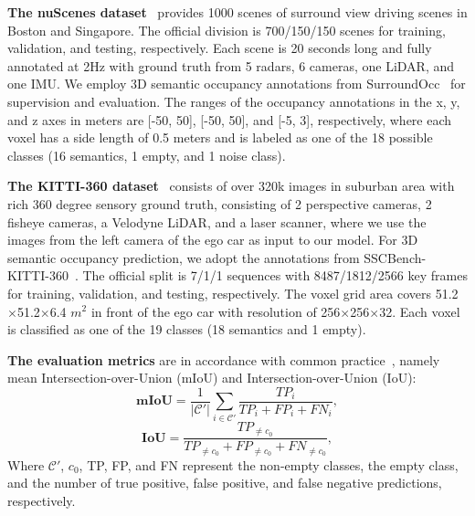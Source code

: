 \textbf{The nuScenes dataset}~\cite{caesar2020nuscenes} provides 1000 scenes of surround view driving scenes in Boston and Singapore. 
The official division is 700/150/150 scenes for training, validation, and testing, respectively. 
Each scene is 20 seconds long and fully annotated at 2Hz with ground truth from 5 radars, 6 cameras, one LiDAR, and one IMU. 
We employ 3D semantic occupancy annotations from SurroundOcc~\cite{wei2023surroundocc} for supervision and evaluation. 
The ranges of the occupancy annotations in the x, y, and z axes in meters are [-50, 50], [-50, 50], and [-5, 3], respectively, where each voxel has a side length of 0.5 meters and is labeled as one of the 18 possible classes (16 semantics, 1 empty, and 1 noise class).

\textbf{The KITTI-360 dataset}~\cite{Liao2022kitti360} consists of over 320k images in suburban area with rich 360 degree sensory ground truth, consisting of 2 perspective cameras, 2 fisheye cameras, a Velodyne LiDAR, and a laser scanner, where we use the images from the left camera of the ego car as input to our model. 
For 3D semantic occupancy prediction, we adopt the annotations from SSCBench-KITTI-360~\cite{li2023sscbench}. 
The official split is 7/1/1 sequences with 8487/1812/2566 key frames for training, validation, and testing, respectively. 
The voxel grid area covers 51.2$\times$51.2$\times$6.4 $m^2$ in front of the ego car with resolution of 256$\times$256$\times$32. 
Each voxel is classified as one of the 19 classes (18 semantics and 1 empty).

\textbf{The evaluation metrics} are in accordance with common practice~\cite{cao2022monoscene}, namely mean Intersection-over-Union (mIoU) and Intersection-over-Union (IoU):
\begin{equation}
\mathbf{mIoU} = \frac{1}{|\mathcal{C}'|}\sum_{i\in \mathcal{C}'}{\frac{TP_i}{TP_i+FP_i+FN_i}},
\end{equation}
\begin{equation}
\mathbf{IoU} = \frac{TP_{\neq c_0}}{TP_{\neq c_0}+FP_{\neq c_0}+FN_{\neq c_0}},
\end{equation}
Where $\mathcal{C}'$, $c_0$, TP, FP, and FN represent the non-empty classes, the empty class, and the number of true positive, false positive, and false negative predictions, respectively.

